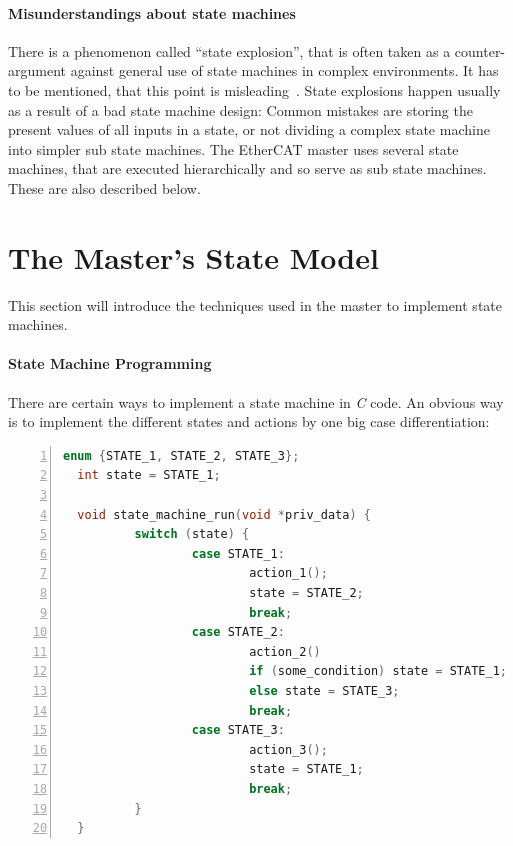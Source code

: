 \documentclass[a4paper,12pt,BCOR6mm,bibtotoc,idxtotoc]{scrbook}
\begin{document}
\paragraph{Misunderstandings about state machines}

There is a phenomenon called ``state explosion'', that is often taken as a
counter-argument against general use of state machines in complex environments.
It has to be mentioned, that this point is misleading~\cite{fsmmis}. State
explosions happen usually as a result of a bad state machine design: Common
mistakes are storing the present values of all inputs in a state, or not
dividing a complex state machine into simpler sub state machines. The EtherCAT
master uses several state machines, that are executed hierarchically and so
serve as sub state machines. These are also described below.


\section{The Master's State Model}
\label{sec:statemodel}

This section will introduce the techniques used in the master to
implement state machines.

\paragraph{State Machine Programming}

There are certain ways to implement a state machine in \textit{C}
code. An obvious way is to implement the different states and actions
by one big case differentiation:

\begin{lstlisting}[gobble=2,language=C,numbers=left]
  enum {STATE_1, STATE_2, STATE_3};
  int state = STATE_1;

  void state_machine_run(void *priv_data) {
          switch (state) {
                  case STATE_1:
                          action_1();
                          state = STATE_2;
                          break;
                  case STATE_2:
                          action_2()
                          if (some_condition) state = STATE_1;
                          else state = STATE_3;
                          break;
                  case STATE_3:
                          action_3();
                          state = STATE_1;
                          break;
          }
  }
\end{lstlisting}
\end{document}
